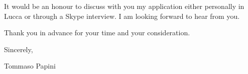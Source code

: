 \documentclass{article}
\begin{document}
    It would be an honour to discuss with you my application either personally in Lucca or through a Skype interview. I am looking forward to hear from you. \par \bigskip
    
    Thank you in advance for your time and your consideration. \par \bigskip
    
    Sincerely, \par \medskip
    
    \qquad \qquad Tommaso Papini
\end{document}
